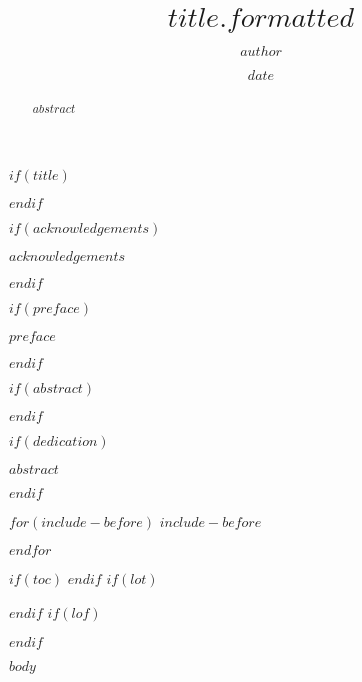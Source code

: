 \documentclass[12pt,twoside]{reedthesis}
\title{$title.formatted$}
\author{$author$}
\date{$date$}
\begin{document}
$if(title)$
\maketitle
$endif$

  \frontmatter %
  \pagestyle{empty} %

$if(acknowledgements)$
\begin{acknowledgements}
$acknowledgements$
\end{acknowledgements}
$endif$

$if(preface)$
\begin{preface}
$preface$
\end{preface}
$endif$

$if(abstract)$
\begin{abstract}
$abstract$
\end{abstract}
$endif$

$if(dedication)$
\begin{dedication}
$abstract$
\end{dedication}
$endif$

$for(include-before)$
$include-before$

$endfor$

$if(toc)$
{
\hypersetup{linkcolor=$if(toccolor)$$toccolor$$else$black$endif$}
\setcounter{tocdepth}{$toc-depth$}
\tableofcontents
}
$endif$
$if(lot)$
\listoftables
$endif$
$if(lof)$
\listoffigures
$endif$

  \mainmatter %
  \pagestyle{fancyplain} %

$body$


\end{document}
